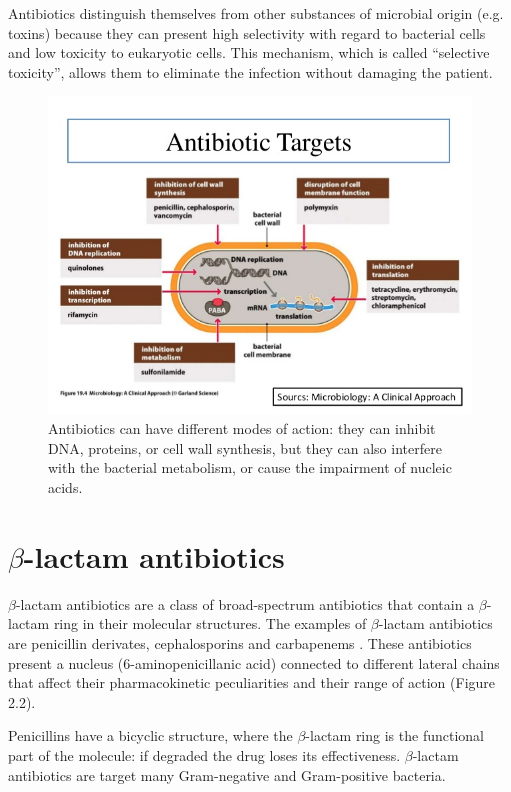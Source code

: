 \documentclass[11pt]{report}
\begin{document}
Antibiotics distinguish themselves from other substances of microbial origin (e.g. toxins) because they can present high selectivity with regard to bacterial cells and low toxicity to eukaryotic cells.
This mechanism, which is called “selective toxicity”, allows them to eliminate the infection without damaging the patient.

\clearpage
\begin{figure}[htp]
\centering
\includegraphics[scale=0.700]{img/Antibiotic_Targets.jpg}
\caption{Antibiotics can have different modes of action: they can inhibit DNA, proteins, or cell wall  synthesis, but they can also interfere with the bacterial metabolism, or cause the impairment of nucleic acids.}
\label{}
\end{figure}

\section{$\beta$-lactam antibiotics}
$\beta$-lactam antibiotics are a class of broad-spectrum antibiotics that contain a $\beta$-lactam ring in their molecular structures.
The examples of $\beta$-lactam antibiotics are penicillin derivates, cephalosporins and carbapenems \cite{Pitout2005}.
These antibiotics present a nucleus (6-aminopenicillanic acid) connected to different lateral chains that affect their pharmacokinetic peculiarities and their range of action (Figure 2.2).

Penicillins have a bicyclic structure, where the $\beta$-lactam ring is the functional part of the molecule: if degraded the drug loses its effectiveness.
$\beta$-lactam antibiotics are target many Gram-negative and Gram-positive bacteria.
\end{document}
